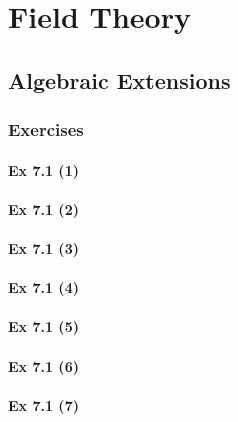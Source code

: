 \setcounter{chapter}{0}
\renewcommand{\thechapter}{7}
\chapter{Field Theory}\label{ch:7}
\setcounter{equation}{0}	        %

\section{Algebraic Extensions}\label{sec:7.1}
\subsection{Exercises}\label{sec:7.1_Exercises}

\subsubsection{Ex 7.1 (1)}\label{sec:Ex_7.1.1}

\subsubsection{Ex 7.1 (2)}\label{sec:Ex_7.1.2}

\subsubsection{Ex 7.1 (3)}\label{sec:Ex_7.1.3}

\subsubsection{Ex 7.1 (4)}\label{sec:Ex_7.1.4}

\subsubsection{Ex 7.1 (5)}\label{sec:Ex_7.1.5}

\subsubsection{Ex 7.1 (6)}\label{sec:Ex_7.1.6}

\subsubsection{Ex 7.1 (7)}\label{sec:Ex_7.1.7}

